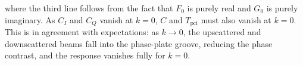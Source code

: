where the third line follows from the fact that
$F_0$ is purely real and $G_0$ is purely imaginary.
As $C_I$ and $C_Q$ vanish at $k = 0$,
$C$ and $T_{\text{pci}}$ must also vanish at $k = 0$.
This is in agreement with expectations:
as $k \rightarrow 0$, the upscattered and downscattered beams
fall into the phase-plate groove,
reducing the phase contrast, and
the response vanishes fully for $k = 0$.
